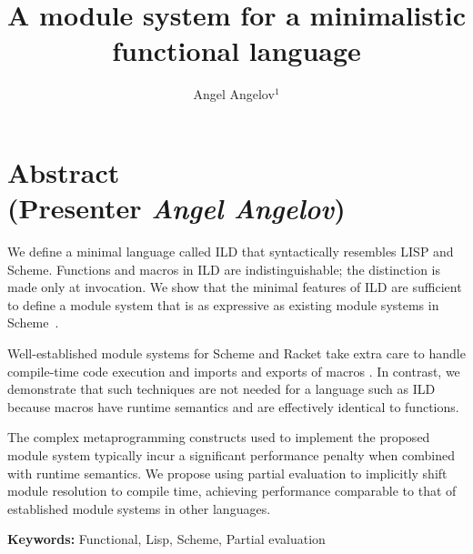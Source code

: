 \documentclass[12pt,a4paper]{amsart}
\title[ILD Module system]{\bf A module system for a minimalistic functional language}
\author[A. Angelov]{Angel Angelov$^1$}
\newcommand\lang{ILD }
\theoremstyle{definition}
\begin{document}
\maketitle

\thispagestyle{fancy}

\section*{Abstract\\{\small\normalfont (Presenter \textit{Angel Angelov})}}

\bigskip
We define a minimal language called \lang that syntactically resembles LISP and
Scheme. Functions and macros in \lang are indistinguishable; the distinction is
made only at invocation. We show that the minimal features of \lang are
sufficient to define a module system that is as expressive as existing module
systems in Scheme~\cite{r6rs}.

Well-established module systems for Scheme and Racket take extra care to handle
compile-time code execution and imports and exports of macros
\cite{module-system-for-scheme}\cite{submodules-in-racket}. In contrast, we
demonstrate that such techniques are not needed for a language such as \lang
because macros have runtime semantics and are effectively identical to
functions.

The complex metaprogramming constructs used to implement the proposed module
system typically incur a significant performance penalty when combined with
runtime semantics. We propose using partial evaluation to implicitly shift
module resolution to compile time, achieving performance comparable to that of
established module systems in other languages.
\bigskip

\noindent\textbf{Keywords:} %
Functional, Lisp, Scheme, Partial evaluation
\bigskip

\pagebreak
\thispagestyle{plain}
\printbibliography[title={References}]

\newpage\thispagestyle{empty}
\end{document}
